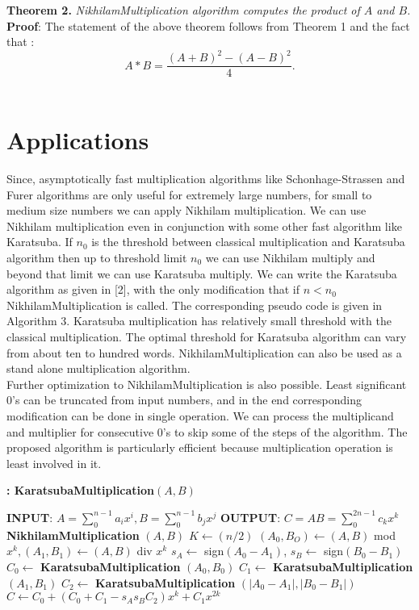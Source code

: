 \documentclass[conference]{IEEEtran}
\begin{document}
\textbf{Theorem 2.} \textit{NikhilamMultiplication algorithm computes the product of $A$ and $B$.}\\

\textbf{Proof}: The statement of the above theorem follows from Theorem 1 and the fact that :
 $$ A*B = \frac{(A+B)^2 - (A-B)^2}{4} .$$  \\

\section{Applications}
Since, asymptotically fast multiplication algorithms like Schonhage-Strassen and Furer algorithms are only useful for extremely large numbers, for small to medium size numbers we can apply Nikhilam multiplication. We can use Nikhilam multiplication even in conjunction with some other fast algorithm like Karatsuba. If $n_0$ is the threshold between classical multiplication and Karatsuba algorithm then up to threshold limit $n_0$ we can use Nikhilam multiply and beyond that limit we can use Karatsuba multiply. We can write the Karatsuba algorithm as given in [2], with the only modification that if $n<n_0$ NikhilamMultiplication is called. The corresponding pseudo code is given in Algorithm 3. Karatsuba multiplication has relatively small threshold with the classical multiplication. The optimal threshold for Karatsuba algorithm can vary from about ten to hundred words. NikhilamMultiplication can also be used as a stand alone multiplication algorithm.\\
\indent Further optimization to NikhilamMultiplication is also possible. Least significant $0$'s can be truncated from input numbers, and in the end corresponding modification can be done in single operation. We can process the multiplicand and multiplier for consecutive $0$'s to skip some of the steps of the algorithm. The proposed algorithm is particularly efficient because multiplication operation is least involved in it.

\begin{algorithm}
\caption{\bf :  KaratsubaMultiplication$(A, B)$}
\begin{algorithmic}
\STATE \textbf{INPUT}: $A=\sum_{0}^{n-1} a_i x^i, B=\sum_{0}^{n-1} b_j x^j$
\STATE \textbf{OUTPUT}: $C=AB=\sum_{0}^{2n-1} c_k x^k $
\RETURN \textbf{NikhilamMultiplication} $(A, B)$
\ENDIF
\STATE $K \leftarrow (n/2)$
\STATE $(A_0, B_O) \leftarrow (A,B)$ mod $x^k ,(A_1, B_1) \leftarrow(A, B)$ div $x^k$ 
\STATE $s_A \leftarrow $ sign$(A_0-A_1)$, $s_B \leftarrow $ sign$(B_0-B_1)$
\STATE $C_0 \leftarrow$ \textbf{KaratsubaMultiplication} $(A_0, B_0)$
\STATE $C_1 \leftarrow$ \textbf{KaratsubaMultiplication} $(A_1, B_1)$
\STATE $C_2 \leftarrow$ \textbf{KaratsubaMultiplication} $(|A_0-A_1|, |B_0-B_1|)$
\RETURN $C \leftarrow C_0 +(C_0 + C_1 - s_A s_B C_2)x^k + C_1 x^{2k} $
\end{algorithmic}
\end{algorithm}
\end{document}
